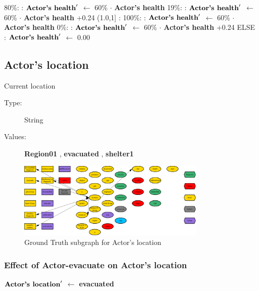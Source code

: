 \documentclass{article}%
\begin{document}
\begin{flushleft}
80\%:%
: %
$\mbox{\textbf{Actor's health}} '$%
$\leftarrow$%
60\%%
$\cdot$%
\textbf{Actor's health}%
\linebreak%
\hspace*{6em}%
19\%:%
: %
$\mbox{\textbf{Actor's health}} '$%
$\leftarrow$%
60\%%
$\cdot$%
\textbf{Actor's health}%
+0.24%
\linebreak%
\hspace*{4em}%
(1.0,1{]}%
: %
\linebreak%
\hspace*{6em}%
100\%:%
: %
$\mbox{\textbf{Actor's health}} '$%
$\leftarrow$%
60\%%
$\cdot$%
\textbf{Actor's health}%
\linebreak%
\hspace*{6em}%
0\%:%
: %
$\mbox{\textbf{Actor's health}} '$%
$\leftarrow$%
60\%%
$\cdot$%
\textbf{Actor's health}%
+0.24%
\linebreak%
\hspace*{2em}%
ELSE %
: %
$\mbox{\textbf{Actor's health}} '$%
$\leftarrow$%
0.00%
\end{flushleft}

%
\subsection{Actor's location}%
\label{subsec:Actor's location}%
Current location%
\begin{description}%
\item[Type:]%
String%
\item[Values:]%
\textbf{Region01}%
, %
\textbf{evacuated}%
, %
\textbf{shelter1}%
\end{description}%


\begin{figure}[ht]%
\centering%
\includegraphics[width=0.8\textwidth]{images/locationOfActor.png}%
\caption{Ground Truth subgraph for Actor's location}%
\end{figure}

%
\subsubsection{Effect of Actor{-}evacuate on Actor's location}%
\label{ssubsec:Effect of Actor{-}evacuate on Actor's location}%
\begin{flushleft}%
$\mbox{\textbf{Actor's location}} '$%
$\leftarrow$%
\textbf{evacuated}%
\end{flushleft}
\end{document}
